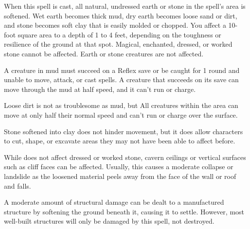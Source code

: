 \spellrng{\rngclose}
\begin{spelleffect}
  When this spell is cast, all natural, undressed earth or stone in the spell's area is softened. Wet earth becomes thick mud, dry earth becomes loose sand or dirt, and stone becomes soft clay that is easily molded or chopped. You affect a 10-foot square area to a depth of 1 to 4 feet, depending on the toughness or resilience of the ground at that spot. Magical, enchanted, dressed, or worked stone cannot be affected. Earth or stone creatures are not affected.
  \par A creature in mud must succeed on a Reflex save or be caught for 1 round and unable to move, attack, or cast spells. A creature that succeeds on its save can move through the mud at half speed, and it can't run or charge.
  \par Loose dirt is not as troublesome as mud, but All creatures within the area can move at only half their normal speed and can't run or charge over the surface.
  \par Stone softened into clay does not hinder movement, but it does allow characters to cut, shape, or excavate areas they may not have been able to affect before.
  \par While  does not affect dressed or worked stone, cavern ceilings or vertical surfaces such as cliff faces can be affected. Usually, this causes a moderate collapse or landslide as the loosened material peels away from the face of the wall or roof and falls.
  \par A moderate amount of structural damage can be dealt to a manufactured structure by softening the ground beneath it, causing it to settle. However, most well-built structures will only be damaged by this spell, not destroyed.
\end{spelleffect}

